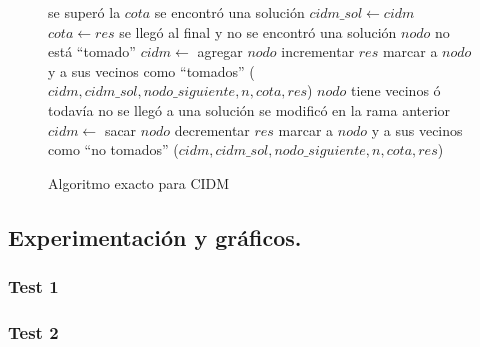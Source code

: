 \begin{figure}
\begin{codebox}
\li \If se superó la $cota$
\li \Then \Return
	\End
\li \If se encontró una solución
\li \Then 
 		$cidm\_sol \leftarrow cidm$
\li 		$cota \leftarrow res$
\li 		\Return
	\End
\li \If se llegó al final y no se encontró una solución
\li \Then \Return
	\End
\li \If $nodo$ no está ``tomado''	
\li \Then
		$cidm \leftarrow$ agregar $nodo$
\li 		incrementar $res$
\li 		marcar a $nodo$ y a sus vecinos como ``tomados''
($cidm,cidm\_sol,nodo\_siguiente,n,cota,res$)
	\End
\li \If $nodo$ tiene vecinos ó todavía no se llegó a una solución
\li \Then
 		\If se modificó en la rama anterior
\li 		\Then
			$cidm \leftarrow$ sacar $nodo$
\li			decrementar $res$
\li 			marcar a $nodo$ y a sus vecinos como ``no tomados''
		\End
{}($cidm,cidm\_sol,nodo\_siguiente,n,cota,res$)
\end{codebox}
\caption{Algoritmo exacto para CIDM}\label{code:exacto}
\end{figure}


\vspace*{0.6cm}
\subsection{Experimentación y gráficos.}

\vspace*{0.3cm}


\subsubsection{Test 1}
\vspace*{0.3cm}

\vspace*{0.6cm}

\subsubsection{Test 2}

